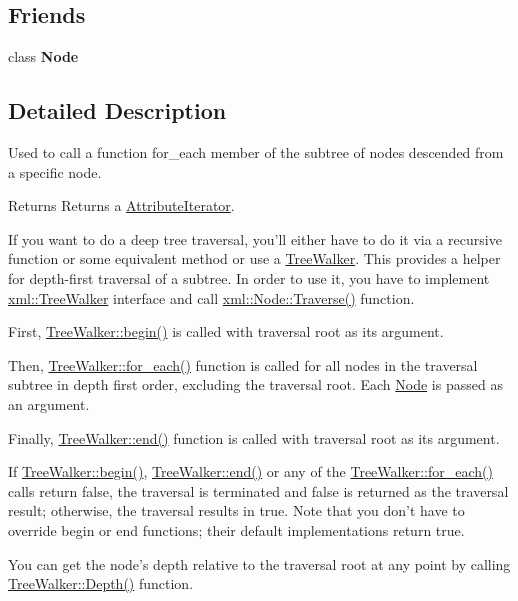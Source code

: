 \subsection*{Friends}
\begin{DoxyCompactItemize}
\item 
\hypertarget{classphys_1_1xml_1_1TreeWalker_a6db9d28bd448a131448276ee03de1e6d}{
class {\bfseries Node}}
\label{d5/d8d/classphys_1_1xml_1_1TreeWalker_a6db9d28bd448a131448276ee03de1e6d}

\end{DoxyCompactItemize}


\subsection{Detailed Description}
Used to call a function for\_\-each member of the subtree of nodes descended from a specific node. \begin{DoxyReturn}{Returns}
Returns a \hyperlink{classphys_1_1xml_1_1AttributeIterator}{AttributeIterator}.
\end{DoxyReturn}
If you want to do a deep tree traversal, you'll either have to do it via a recursive function or some equivalent method or use a \hyperlink{classphys_1_1xml_1_1TreeWalker}{TreeWalker}. This provides a helper for depth-\/first traversal of a subtree. In order to use it, you have to implement \hyperlink{classphys_1_1xml_1_1TreeWalker}{xml::TreeWalker} interface and call \hyperlink{classphys_1_1xml_1_1Node_a0029d08d3689c36d882ada0c0c9cf6e9}{xml::Node::Traverse()} function. \par
\par
 First, \hyperlink{classphys_1_1xml_1_1TreeWalker_a649d9e5a06542be0282d3d20994a62fc}{TreeWalker::begin()} is called with traversal root as its argument.\par
 Then, \hyperlink{classphys_1_1xml_1_1TreeWalker_a03267e73acac44809f16739fd00a536d}{TreeWalker::for\_\-each()} function is called for all nodes in the traversal subtree in depth first order, excluding the traversal root. Each \hyperlink{classphys_1_1xml_1_1Node}{Node} is passed as an argument.\par
 Finally, \hyperlink{classphys_1_1xml_1_1TreeWalker_a210f6d60579a152f89e651be797885b9}{TreeWalker::end()} function is called with traversal root as its argument.\par
\par
 If \hyperlink{classphys_1_1xml_1_1TreeWalker_a649d9e5a06542be0282d3d20994a62fc}{TreeWalker::begin()}, \hyperlink{classphys_1_1xml_1_1TreeWalker_a210f6d60579a152f89e651be797885b9}{TreeWalker::end()} or any of the \hyperlink{classphys_1_1xml_1_1TreeWalker_a03267e73acac44809f16739fd00a536d}{TreeWalker::for\_\-each()} calls return false, the traversal is terminated and false is returned as the traversal result; otherwise, the traversal results in true. Note that you don't have to override begin or end functions; their default implementations return true.\par
\par
 You can get the node's depth relative to the traversal root at any point by calling \hyperlink{classphys_1_1xml_1_1TreeWalker_a90fdd705ae4d5e8e3b931bb8896e4397}{TreeWalker::Depth()} function. 

